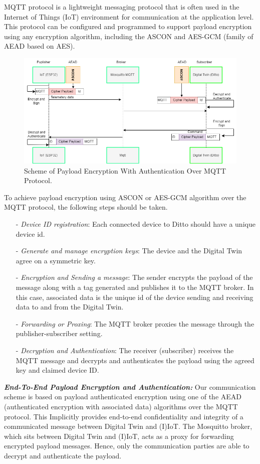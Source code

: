 MQTT protocol is a lightweight messaging protocol that is often used in the Internet of Things (IoT) environment for communication at the application level. This protocol can be configured and programmed to support payload encryption using any encryption algorithm, including the ASCON and AES-GCM (family of AEAD based on AES). 

\begin{figure}[H]
   
    \centering
    \includegraphics[width=\textwidth]{images/fp/payloadenc.drawio.png}
     \caption{Scheme of Payload Encryption With Authentication Over MQTT Protocol. }
    \label{fig:payload-encauth-schem}
\end{figure}

To achieve payload encryption using ASCON or AES-GCM algorithm over the MQTT protocol, the following steps should be taken. 
\begin{itemize}
    \item[-] \textit{Device ID registration}: Each connected device to Ditto should have a unique device id. 
    \item[-] \textit{Generate and manage encryption keys}: The device and the Digital Twin agree on a symmetric key. 
    \item[-] \textit{Encryption and Sending a message}: The sender encrypts the payload of the message along with a tag generated and publishes it to the MQTT broker. In this case, associated data is the unique id of the device sending and receiving data to and from the Digital Twin. 
    \item[-] \textit{Forwarding or Proxing}: The MQTT broker proxies the message through the publisher-subscriber setting. 
    \item[-] \textit{Decryption and Authentication}: The receiver (subscriber) receives the MQTT message and decrypts and authenticates the payload using the agreed key and claimed device ID.
    
\end{itemize}

\textbf{\textit{End-To-End Payload Encryption and Authentication:}}
Our communication scheme is based on payload authenticated encryption using one of the AEAD (authenticated encryption with associated data) algorithms over the MQTT protocol. This Implicitly provides end-to-end confidentiality and integrity of a communicated message between Digital Twin and (I)IoT. The Mosquitto broker, which sits between Digital Twin and (I)IoT,  acts as a proxy for forwarding encrypted payload messages. Hence, only the communication parties are able to decrypt and authenticate the payload. 

